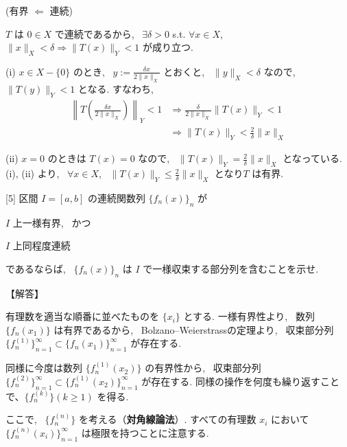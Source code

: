 \documentclass{jsarticle}
\begin{document}
(有界 $\Longleftarrow$ 連続)

$T$ は $0 \in X$ で連続であるから, \ $\exists \delta > 0$ s.t. $\forall x \in X$, \ $\| x \|_X < \delta \Longrightarrow \|T(x)\|_Y < 1$ が成り立つ.

\noindent
(i) $x \in X - \{0\}$ のとき, \ $y := \displaystyle \frac{\delta x}{2\|x\|_X}$ とおくと, \ $\| y\|_X < \delta$ なので, \ 
$\|T(y)\|_Y < 1$ となる. すなわち, \ 
\begin{align*}
\left\| T \left(\displaystyle \frac{\delta x}{2\|x\|_X} \right) \right\|_Y < 1 
& \Longrightarrow \displaystyle \frac{\delta}{2\| x \|_X} \|T(x)\|_Y < 1\\
& \Longrightarrow \| T(x) \|_Y < \displaystyle \frac{2}{\delta} \|x\|_X
\end{align*}

\noindent
(ii) $x = 0$ のときは $T(x) = 0$ なので, \ $\| T(x) \|_Y = \displaystyle \frac{2}{\delta} \|x\|_X$ となっている.\\
(i), (ii) より, \ $\forall x \in X$, \ $\| T(x) \|_Y \leq \displaystyle \frac{2}{\delta} \|x\|_X$ となり$T$ は有界.



\bigskip
\bigskip

\begin{itembox}[l]{[5]}
区間 $I = [a, b]$ の連続関数列 $\{f_n(x)\}_n$ が

    \begin{enumerate*}[label=(\alph*)]
        \item $I$ 上一様有界, \ かつ \ 
        \item $I$ 上同程度連続
    \end{enumerate*}
    
であるならば, \ $\{f_n(x)\}_n$ は $I$ で一様収束する部分列を含むことを示せ.
\end{itembox}

【解答】

有理数を適当な順番に並べたものを \(\{x_i\}\) とする. 一様有界性より, \ 数列 \(\{f_n(x_1)\}\) は有界であるから, \ Bolzano–Weierstrassの定理より, \ 収束部分列 \(\{f^{(1)}_n\}^\infty_{n=1} \subset \{f_n(x_1)\}^\infty_{n=1}\) が存在する.

同様に今度は数列 \(\{f^{(1)}_n(x_2)\}\) の有界性から, \ 収束部分列 \(\{f^{(2)}_n\}^\infty_{n=1} \subset \{f^{(1)}_n(x_2)\}^\infty_{n=1}\) が存在する.
同様の操作を何度も繰り返すことで、\(\{f^{(k)}_n\} (k \geq 1)\) を得る.

ここで, \ \(\{f^{(n)}_n\}\) を考える（\textbf{対角線論法}）. すべての有理数 \(x_i\) において \(\{f^{(n)}_n(x_i)\}^\infty_{n=1}\) は極限を持つことに注意する.
\end{document}
